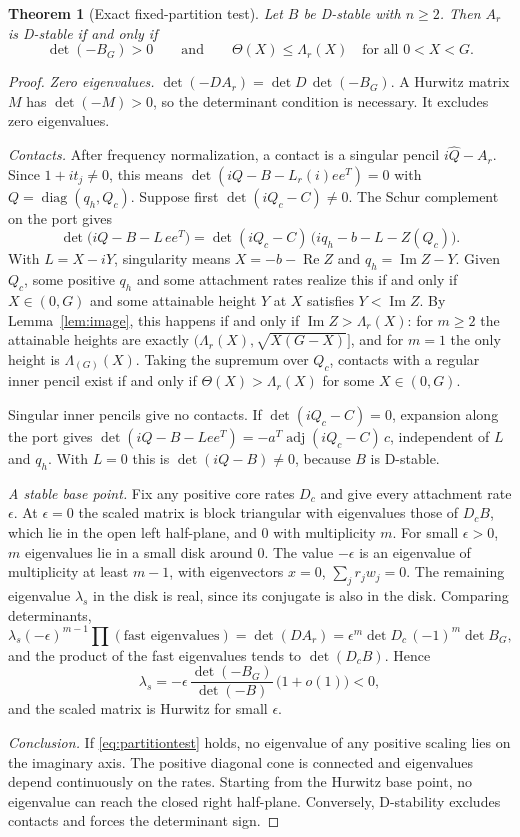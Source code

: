 \documentclass[11pt,a4paper]{article}
\theoremstyle{plain}
\newtheorem{theorem}{Theorem}[section]
\theoremstyle{definition}
\theoremstyle{remark}
\newcommand{\Real}{\operatorname{Re}}
\newcommand{\Imag}{\operatorname{Im}}
\newcommand{\diag}{\operatorname{diag}}
\newcommand{\adj}{\operatorname{adj}}
\newcommand{\Env}{\Lambda}
\newcommand{\Core}{\Theta}
\begin{document}
\begin{theorem}[Exact fixed-partition test]\label{thm:partition}
Let $B$ be D-stable with $n\ge2$. Then $A_r$ is D-stable if and only if
\begin{equation}\label{eq:partitiontest}
 \det(-B_G)>0\qquad\text{and}\qquad \Core(X)\le\Env_r(X)\quad\text{for all }0<X<G.
\end{equation}
\end{theorem}
\begin{proof}
\emph{Zero eigenvalues.} $\det(-DA_r)=\det D\,\det(-B_G)$. A Hurwitz matrix
$M$ has $\det(-M)>0$, so the determinant condition is necessary. It excludes
zero eigenvalues.

\emph{Contacts.} After frequency normalization, a contact is a singular pencil
$i\hat Q-A_r$. Since $1+it_j\ne0$, this means
$\det(iQ-B-L_r(i)ee^{T})=0$ with $Q=\diag(q_h,Q_c)$. Suppose first
$\det(iQ_c-C)\ne0$. The Schur complement on the port gives
\[
 \det\bigl(iQ-B-L\,ee^{T}\bigr)=\det(iQ_c-C)\,\bigl(iq_h-b-L-Z(Q_c)\bigr).
\]
With $L=X-iY$, singularity means $X=-b-\Real Z$ and $q_h=\Imag Z-Y$. Given $Q_c$,
some positive $q_h$ and some attachment rates realize this if and only if
$X\in(0,G)$ and some attainable height $Y$ at $X$ satisfies $Y<\Imag Z$. By
Lemma~\ref{lem:image}, this happens if and only if $\Imag Z>\Env_r(X)$: for
$m\ge2$ the attainable heights are exactly $(\Env_r(X),\sqrt{X(G-X)}]$, and
for $m=1$ the only height is $\Env_{(G)}(X)$. Taking the supremum over $Q_c$,
contacts with a regular inner pencil exist if and only if
$\Core(X)>\Env_r(X)$ for some $X\in(0,G)$.

Singular inner pencils give no contacts. If $\det(iQ_c-C)=0$, expansion along
the port gives $\det(iQ-B-Lee^{T})=-a^{T}\adj(iQ_c-C)\,c$, independent of $L$
and $q_h$. With $L=0$ this is $\det(iQ-B)\ne0$, because $B$ is D-stable.

\emph{A stable base point.} Fix any positive core rates $D_c$ and give every
attachment rate $\epsilon$. At $\epsilon=0$ the scaled matrix is block
triangular with eigenvalues those of $D_cB$, which lie in the open left
half-plane, and $0$ with multiplicity $m$. For small $\epsilon>0$, $m$
eigenvalues lie in a small disk around $0$. The value $-\epsilon$ is an
eigenvalue of multiplicity at least $m-1$, with eigenvectors $x=0$,
$\sum_jr_jw_j=0$. The remaining eigenvalue $\lambda_s$ in the disk is real,
since its conjugate is also in the disk. Comparing determinants,
\[
 \lambda_s(-\epsilon)^{m-1}\prod(\text{fast eigenvalues})
 =\det(DA_r)=\epsilon^m\det D_c\,(-1)^m\det B_G,
\]
and the product of the fast eigenvalues tends to $\det(D_cB)$. Hence
\[
 \lambda_s=-\epsilon\,\frac{\det(-B_G)}{\det(-B)}\,\bigl(1+o(1)\bigr)<0,
\]
and the scaled matrix is Hurwitz for small $\epsilon$.

\emph{Conclusion.} If \eqref{eq:partitiontest} holds, no eigenvalue of any
positive scaling lies on the imaginary axis. The positive diagonal cone is
connected and eigenvalues depend continuously on the rates. Starting from the
Hurwitz base point, no eigenvalue can reach the closed right half-plane.
Conversely, D-stability excludes contacts and forces the determinant sign.
\end{proof}
\end{document}
